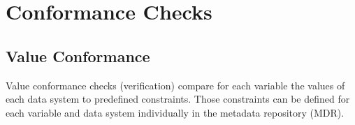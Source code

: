 \documentclass[
]{article}
\begin{document}
\newpage

\hypertarget{conformance-checks}{%
\section{Conformance Checks}\label{conformance-checks}}

\hypertarget{value-conformance}{%
\subsection{Value Conformance}\label{value-conformance}}

Value conformance checks (verification) compare for each variable the
values of each data system to predefined constraints. Those constraints
can be defined for each variable and data system individually in the
metadata repository (MDR).
\end{document}
